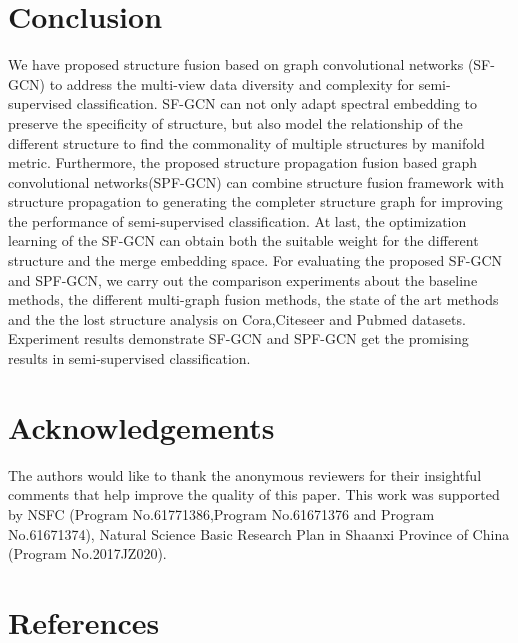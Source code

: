\documentclass[review]{elsarticle}
\begin{document}
\begin{itemize}
\end{itemize}

\section{Conclusion}
We have proposed structure fusion based on graph convolutional networks (SF-GCN) to address the multi-view data diversity and complexity for semi-supervised classification. SF-GCN can not only adapt spectral embedding to preserve the specificity of structure, but also model the relationship of the different structure to find the commonality of multiple structures by manifold metric. Furthermore, the proposed structure propagation fusion based graph convolutional networks(SPF-GCN) can combine structure fusion framework with structure propagation to generating the completer structure graph for improving the performance of semi-supervised classification. At last, the optimization learning of the SF-GCN can obtain both the suitable weight for the different structure and the merge embedding space. For evaluating the proposed  SF-GCN and SPF-GCN, we carry out the comparison experiments about the baseline methods, the different multi-graph fusion methods, the state of the art methods and the the lost structure analysis on Cora,Citeseer and Pubmed datasets. Experiment results demonstrate SF-GCN and SPF-GCN get the promising results in semi-supervised classification.


\section{Acknowledgements}
The authors would like to thank the anonymous reviewers for their insightful comments that help improve the quality of this paper. This work was supported by NSFC (Program No.61771386,Program No.61671376 and Program No.61671374), Natural Science Basic Research Plan in Shaanxi Province of China (Program No.2017JZ020).




\section*{References}


\end{document}
